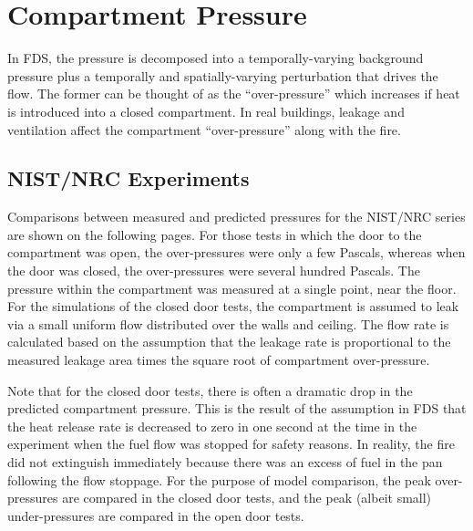 
\chapter{Compartment Pressure}

In FDS, the pressure is decomposed into a temporally-varying background pressure plus a temporally and spatially-varying perturbation that drives the flow. The former can be thought of as the ``over-pressure'' which increases if heat is introduced into a closed compartment. In real buildings, leakage and ventilation affect the compartment ``over-pressure'' along with the fire.

\section{NIST/NRC Experiments}

Comparisons between measured and predicted pressures for the NIST/NRC series are shown on the following pages. For those tests in which the door to the compartment was open, the over-pressures were only a few Pascals, whereas when the door was closed, the over-pressures were several hundred Pascals. The pressure within the compartment was measured at a single point, near the floor. For the simulations of the closed door tests, the compartment is assumed to leak via a small uniform flow distributed over the walls and ceiling. The flow rate is calculated based on the assumption that the leakage rate is proportional to the measured leakage area times the square root of compartment over-pressure.

Note that for the closed door tests, there is often a dramatic drop in the predicted compartment pressure. This is the result of the assumption in FDS that the heat release rate is decreased to zero in one second at the time in the experiment when the fuel flow was stopped for safety reasons.  In reality, the fire did not extinguish immediately because there was an excess of fuel in the pan following the flow stoppage. For the purpose of model comparison, the peak over-pressures are compared in the closed door tests, and the peak (albeit small) under-pressures are compared in the open door tests.

\newpage

